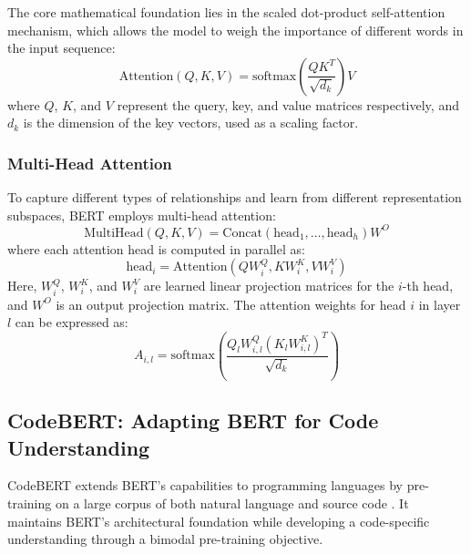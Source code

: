 \documentclass[conference]{IEEEtran}
\begin{document}
The core mathematical foundation lies in the scaled dot-product self-attention mechanism, which allows the model to weigh the importance of different words in the input sequence:
\begin{equation}
    \text{Attention}(Q, K, V) = \text{softmax}\left(\frac{QK^T}{\sqrt{d_k}}\right)V
    \label{eq:self_attention}
\end{equation}
where $Q$, $K$, and $V$ represent the query, key, and value matrices respectively, and $d_k$ is the dimension of the key vectors, used as a scaling factor.

\subsubsection{Multi-Head Attention}
To capture different types of relationships and learn from different representation subspaces, BERT employs multi-head attention:
\begin{equation}
    \text{MultiHead}(Q, K, V) = \text{Concat}(\text{head}_1, \dots, \text{head}_h)W^O
    \label{eq:multihead_attention}
\end{equation}
where each attention head is computed in parallel as:
\begin{equation}
    \text{head}_i = \text{Attention}(QW_i^Q, KW_i^K, VW_i^V)
    \label{eq:attention_head}
\end{equation}
Here, $W_i^Q$, $W_i^K$, and $W_i^V$ are learned linear projection matrices for the $i$-th head, and $W^O$ is an output projection matrix. The attention weights for head $i$ in layer $l$ can be expressed as:
\begin{equation}
    A_{i,l} = \text{softmax}\left(\frac{Q_lW_{i,l}^Q(K_lW_{i,l}^K)^T}{\sqrt{d_k}}\right)
    \label{eq:attention_weights}
\end{equation}

\subsection{CodeBERT: Adapting BERT for Code Understanding}
\label{ssec:codebert}
CodeBERT extends BERT's capabilities to programming languages by pre-training on a large corpus of both natural language and source code \cite{feng2020codebert}. It maintains BERT's architectural foundation while developing a code-specific understanding through a bimodal pre-training objective.
\end{document}
